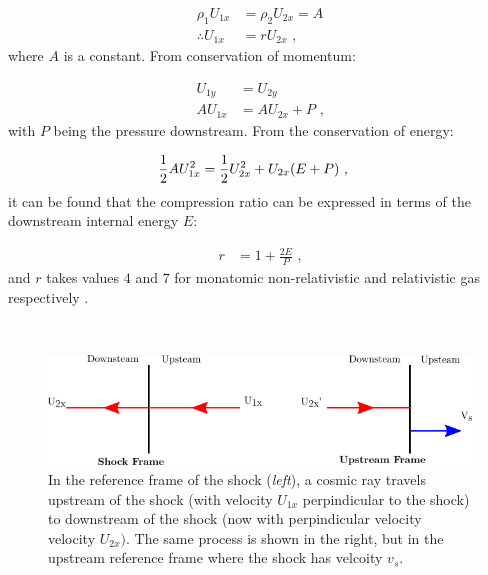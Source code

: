 \begin{equation}
    \begin{aligned}
        \rho_1U_{1x}&=\rho_2U_{2x}=A \\
        \therefore U_{1x}&=rU_{2x}\text{ ,}
    \end{aligned} \label{eq:A3_velocity_ratios}
\end{equation}
\noindent where $A$ is a constant. From conservation of momentum:

\begin{subequations}
    \begin{alignat}{1}
        U_{1y}&=U_{2y} \\
        AU_{1x}&=AU_{2x}+P\text{ ,}
    \end{alignat}
\end{subequations}
\noindent with $P$ being the pressure downstream. From the conservation of energy:

\begin{equation}
    \begin{aligned}
        \frac{1}{2}AU_{1x}^2&=\frac{1}{2}U_{2x}^2+U_{2x}\qty(E+P)\text{ ,}
    \end{aligned}
\end{equation}
\noindent it can be found that the compression ratio can be expressed in terms of the downstream internal energy $E$:

\begin{equation}
    \begin{aligned}
        r&=1+\frac{2E}{P}\text{ ,}
    \end{aligned}
\end{equation}
\noindent and $r$ takes values $4$ and $7$ for monatomic non-relativistic and relativistic gas respectively  \citep{1983RPPh...46..973D}.
\par~\par 
\begin{figure}[h]
	\centering
	\includegraphics[width=1.0\textwidth]{A3_Diffusive_Shock_Acceleration/Images/upstream_downstream.png}
	\caption{In the reference frame of the shock (\textit{left}), a cosmic ray travels upstream of the shock (with velocity $U_{1x}$ perpindicular to the shock) to downstream of the shock (now with perpindicular velocity velocity $U_{2x})$. The same process is shown in the right, but in the upstream reference frame where the shock has velcoity $v_s$.}
	\label{fig:A3_shock_dynamics2}
\end{figure}

